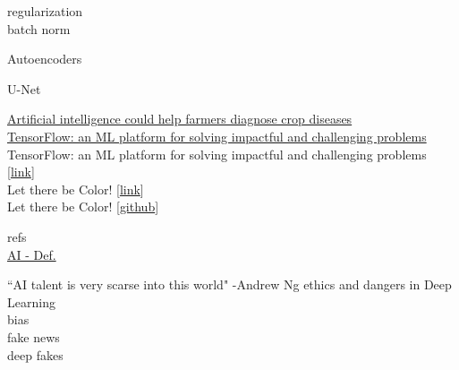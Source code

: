 \documentclass[10pt, compress]{beamer}
\begin{document}
\begin{frame}
  regularization  \\
  batch norm \\
\end{frame}

\begin{frame}
  Autoencoders
\end{frame}

\begin{frame}
  U-Net
\end{frame}

\begin{frame}
\href{https://news.psu.edu/story/429727/2016/10/04/research/artificial-intelligence-could-help-farmers-diagnose-crop-diseases}{Artificial intelligence could help farmers diagnose crop diseases} \\
%
\href{https://www.youtube.com/watch?v=NlpS-DhayQA}{TensorFlow: an ML platform for solving impactful and challenging problems} \\

TensorFlow: an ML platform for solving impactful and challenging problems [\href{https://www.youtube.com/watch?v=NlpS-DhayQA}{link}] \\

Let there be Color! [\href{http://iizuka.cs.tsukuba.ac.jp/projects/colorization/extra.html}{link}] \\

Let there be Color! [\href{https://github.com/satoshiiizuka/siggraph2016_colorization}{github}]

refs \\
\href{https://www.sciencedaily.com/terms/artificial_intelligence.htm}{AI - Def.}
\end{frame}

\begin{frame}
  \vspace{1cm}
  ``AI talent is very scarse into this world" -Andrew Ng
  ethics and dangers in Deep Learning \\
  bias \\
  fake news \\
  deep fakes
\end{frame}
\end{document}
